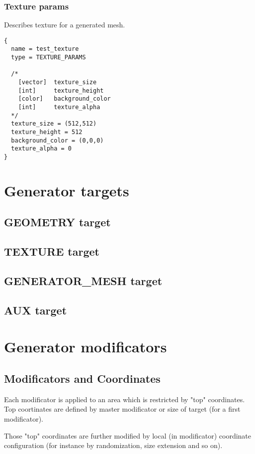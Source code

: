 \documentclass[9pt]{article}
\begin{document}
\subsubsection{Texture params}

Describes texture for a generated mesh.

\begin{verbatim}
{
  name = test_texture
  type = TEXTURE_PARAMS

  /*
    [vector]  texture_size
    [int]     texture_height
    [color]   background_color
    [int]     texture_alpha
  */
  texture_size = (512,512)  
  texture_height = 512
  background_color = (0,0,0)
  texture_alpha = 0
}
\end{verbatim}

\section{Generator targets}
\subsection{GEOMETRY target}
\subsection{TEXTURE target}
\subsection{GENERATOR\_MESH target}
\subsection{AUX target}

\section{Generator modificators}

\subsection{Modificators and Coordinates}

Each modificator is applied to an area which is restricted by "top" coordinates. 
Top coortinates are defined by master modificator or size of target 
(for a first modificator).

Those "top" coordinates are further modified by local (in modificator) 
coordinate configuration (for instance by randomization, size extension
and so on).
\end{document}
